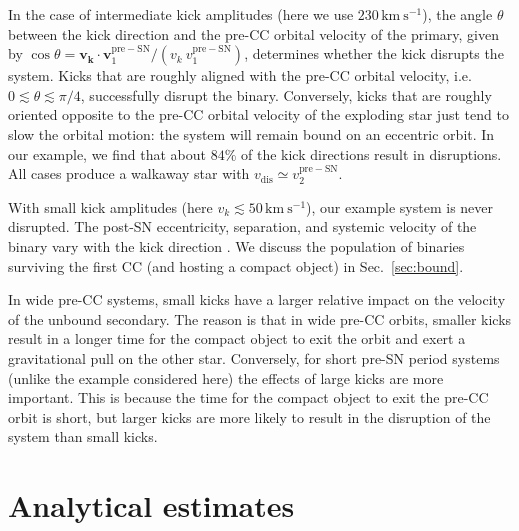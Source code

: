 \documentclass{aa}
\DeclareRobustCommand{\Secref}[1]{Sec.~\ref{#1}}
\begin{document}
In the case of intermediate kick amplitudes (here we use
$230\,\mathrm{km\ s^{-1}}$), the angle $\theta$ between the kick direction and the
pre-CC orbital velocity of the primary, given by $\cos\theta = \mathbf{v_k}\cdot\mathbf{v}_1^\mathrm{pre-SN}/(v_k
\ v_1^\mathrm{pre-SN})$, determines whether the kick disrupts the
system. Kicks that are roughly aligned with the pre-CC orbital
velocity, i.e.\ $0 \lesssim \theta\lesssim\pi/4$, successfully disrupt the
binary. Conversely, kicks that are roughly oriented opposite to the
pre-CC orbital velocity of the exploding star just tend to slow the
orbital motion: the system will remain bound on an eccentric
orbit. In our example, we find that about $84\%$ of the kick
directions result in disruptions. All cases produce a walkaway
star with $v_\mathrm{dis}\simeq v_2^\mathrm{pre-SN}$.

With small kick amplitudes (here $v_k\lesssim50\,\mathrm{km \ s^{-1}}$),
our example system is never disrupted. The post-SN eccentricity, separation, and systemic velocity of the
binary vary with the kick direction \citep[e.g.,][]{brandt:95,
  kalogera:96, tauris:98}. We discuss the population of binaries surviving the
first CC (and hosting a compact object) in \Secref{sec:bound}.

In wide pre-CC systems, small kicks have a larger relative impact on the
velocity of the unbound secondary. The reason is that in wide pre-CC
orbits, smaller kicks result in a longer time for the compact object
to exit the orbit and exert a gravitational pull on the other
star. Conversely, for short pre-SN period systems (unlike the example
considered here) the effects of large kicks 
are more important. This is because the time for the compact object to
exit the pre-CC orbit is short, but larger kicks are more
likely to result in the disruption of the system than small kicks.

\section{Analytical  estimates}
\label{sec:analytics}
\end{document}
